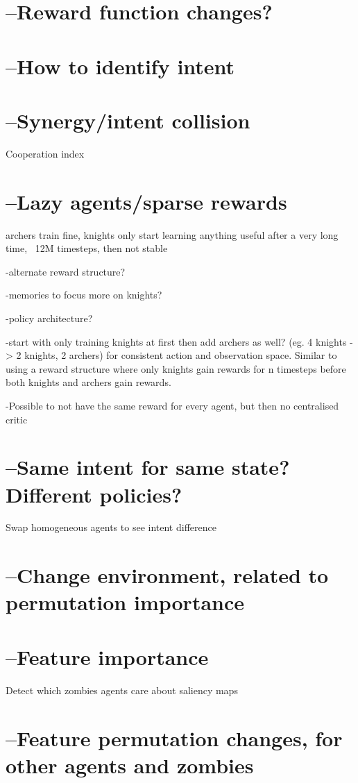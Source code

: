 \documentclass[UKenglish]{uiomasterthesis}
\begin{document}
\section{--Reward function changes?}

\section{--How to identify intent}

\section{--Synergy/intent collision}
Cooperation index

\section{--Lazy agents/sparse rewards}
archers train fine, knights only start learning anything useful after a very long time, ~12M timesteps, then not stable

-alternate reward structure?

-memories to focus more on knights?

-policy architecture?

-start with only training knights at first then add archers as well? (eg. 4 knights -> 2 knights, 2 archers) for consistent action and observation space. Similar to using a reward structure where only knights gain rewards for n timesteps before both knights and archers gain rewards. 

-Possible to not have the same reward for every agent, but then no centralised critic

\section{--Same intent for same state? Different policies?}
Swap homogeneous agents to see intent difference

\section{--Change environment, related to permutation importance}

\section{--Feature importance}
Detect which zombies agents care about
saliency maps

\section{--Feature permutation changes, for other agents and zombies}
{}

\end{document}

